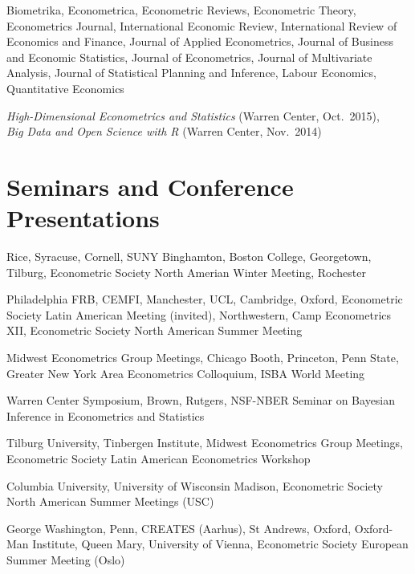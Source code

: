 \documentclass[line,overlapped]{myres}
\begin{document}
\begin{resume}
\begin{description}[style=multiline,leftmargin=3cm,font=\normalfont]
  \item[Refereeing:] Biometrika, Econometrica, Econometric Reviews, Econometric Theory, Econometrics Journal, International Economic Review, International Review of Economics and Finance, Journal of Applied Econometrics, Journal of Business and Economic Statistics, Journal of Econometrics, Journal of Multivariate Analysis, Journal of Statistical Planning and Inference, Labour Economics, Quantitative Economics 
  \item[Workshops \\ Organized:]
    \emph{High-Dimensional Econometrics and Statistics} (Warren Center, Oct.\ 2015), \\
    \emph{Big Data and Open Science with R} (Warren Center, Nov.\ 2014)
\end{description}



\section{\sc Seminars and Conference Presentations}

\begin{description}[style=multiline,leftmargin=2cm,font=\normalfont]
  \item[2017--2018:] Rice, Syracuse, Cornell, SUNY Binghamton, Boston College, Georgetown, Tilburg, Econometric Society North Amerian Winter Meeting, Rochester
\item[2016--2017:] Philadelphia FRB, CEMFI, Manchester, UCL, Cambridge, Oxford, Econometric Society Latin American Meeting (invited), Northwestern, Camp Econometrics XII, Econometric Society North American Summer Meeting
\item[2015--2016:] Midwest Econometrics Group Meetings, Chicago Booth, Princeton, Penn State, Greater New York Area Econometrics Colloquium, ISBA World Meeting 
\item[2014--2015:] Warren Center Symposium, Brown, Rutgers, NSF-NBER Seminar on Bayesian Inference in Econometrics and Statistics 
\item[2013--2014:] Tilburg University, Tinbergen Institute, Midwest Econometrics Group Meetings, Econometric Society Latin American Econometrics Workshop
\item[2012--2013:] Columbia University, University of Wisconsin Madison, Econometric Society North American Summer Meetings (USC)
\item[2011--2012:] George Washington, Penn, CREATES (Aarhus), St Andrews, Oxford, Oxford-Man Institute, Queen Mary, University of Vienna, Econometric Society European Summer Meeting (Oslo)
\end{description}



\end{resume}
\end{document}
